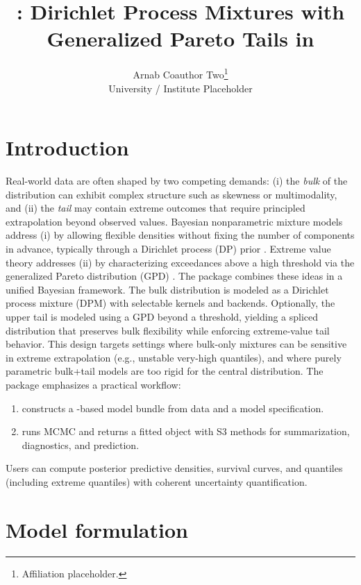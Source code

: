 \documentclass[article]{jss}\usepackage[]{graphicx}\usepackage[]{xcolor}
\title{\pkg{DPmixGPD}: Dirichlet Process Mixtures with Generalized Pareto Tails in \proglang{R}}
\author{Arnab \And Coauthor Two\footnote{Affiliation placeholder.} \\
  University / Institute Placeholder
}
\begin{document}
\maketitle

\section{Introduction}

Real-world data are often shaped by two competing demands: (i) the \emph{bulk} of the distribution can exhibit complex structure such as skewness or multimodality, and (ii) the \emph{tail} may contain extreme outcomes that require principled extrapolation beyond observed values.
Bayesian nonparametric mixture models address (i) by allowing flexible densities without fixing the number of components in advance, typically through a Dirichlet process (DP) prior \citep{Ferguson1973, Neal2000}.
Extreme value theory addresses (ii) by characterizing exceedances above a high threshold via the generalized Pareto distribution (GPD) \citep{Pickands1975, DeHaanFerreira2006}.
The  package combines these ideas in a unified Bayesian framework.
The bulk distribution is modeled as a Dirichlet process mixture (DPM) with selectable kernels and backends.
Optionally, the upper tail is modeled using a GPD beyond a threshold, yielding a spliced distribution that preserves bulk flexibility while enforcing extreme-value tail behavior.
This design targets settings where bulk-only mixtures can be sensitive in extreme extrapolation (e.g., unstable very-high quantiles), and where purely parametric bulk+tail models are too rigid for the central distribution.
The package emphasizes a practical workflow:
\begin{enumerate}
  \item {} constructs a -based model bundle from data and a model specification.
  \item {} runs MCMC and returns a fitted object with S3 methods for summarization, diagnostics, and prediction.
\end{enumerate}
Users can compute posterior predictive densities, survival curves, and quantiles (including extreme quantiles) with coherent uncertainty quantification.

\section{Model formulation}
\end{document}
